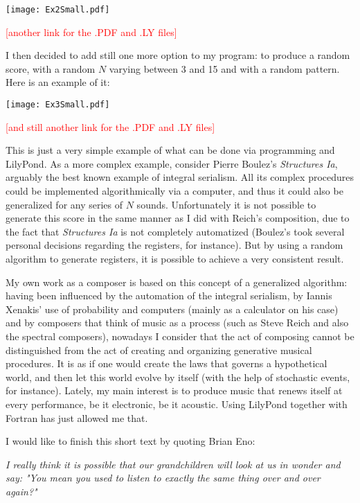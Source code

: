 \documentclass{article}
\begin{document}
\texttt{[image: Ex2Small.pdf]}

\textcolor{red}{[another link for the .PDF and .LY files]}

I then decided to add still one more option to my program: to produce a random score, with a random $N$ varying
between 3 and 15 and with a random pattern. 
Here is an example of it:

\texttt{[image: Ex3Small.pdf]}

\textcolor{red}{[and still another link for the .PDF and .LY files]} 

This is just a very simple example of what can be done via programming and LilyPond. 
As a more complex example, consider Pierre Boulez's \textit{Structures Ia}, arguably the best known example of 
integral serialism. All its complex procedures could be implemented algorithmically via a computer, and thus it 
could also be generalized for any series of $N$ sounds. Unfortunately it is not possible to generate this score 
in the same manner as I did with Reich's composition, due to the fact that \textit{Structures Ia} is not completely 
automatized (Boulez's took several personal decisions regarding the registers, for instance). But by using a random 
algorithm to generate registers, it is possible to achieve a very consistent result.

My own work as a composer is based on this concept of a generalized algorithm: 
having been influenced by the automation of the integral serialism, by Iannis Xenakis' use of probability and
computers (mainly as a calculator on his case) and by composers that think of music as a process (such as Steve
Reich and also the spectral composers), nowadays I consider that the act of composing cannot be distinguished from
the act of creating and organizing generative musical procedures. 
It is as if one would create the laws that governs a hypothetical world, and then let this world evolve by
itself (with the help of stochastic events, for instance). 
Lately, my main interest is to produce music that renews itself at every performance, be it electronic,
be it acoustic. 
Using LilyPond together with Fortran has just allowed me that.

I would like to finish this short text by quoting Brian Eno:

\textit{I really think it is possible that our grandchildren will look at us in wonder and say:
"You mean you used to listen to exactly the same thing over and over again?"}
\end{document}
